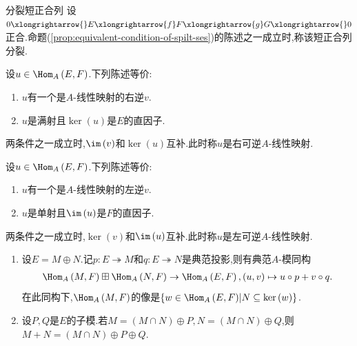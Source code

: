 \begin{definition}{分裂短正合列}{}
	设$0\xlongrightarrow{}E\xlongrightarrow{f}F\xlongrightarrow{g}G\xlongrightarrow{}0$正合.命题(\ref{prop:equivalent-condition-of-spilt-ses})的陈述之一成立时,称该短正合列分裂.
\end{definition}

\begin{corollary}{}{}
	设$u\in\Hom_{A}\left(E,F\right)$.下列陈述等价:
	\begin{enumerate}
		\item $u$有一个是$A$-线性映射的右逆$v$.
		\item $u$是满射且$\ker\left(u\right)$是$E$的直因子.
	\end{enumerate}
	两条件之一成立时,$\im\left(v\right)$和$\ker\left(u\right)$互补.此时称$u$是右可逆$A$-线性映射.
\end{corollary}

\begin{corollary}{}{}
	设$u\in\Hom_{A}\left(E,F\right)$.下列陈述等价:
	\begin{enumerate}
		\item $u$有一个是$A$-线性映射的左逆$v$.
		\item $u$是单射且$\im\left(u\right)$是$F$的直因子.
	\end{enumerate}
	两条件之一成立时,$\ker\left(v\right)$和$\im\left(u\right)$互补.此时称$u$是左可逆$A$-线性映射.
\end{corollary}

\begin{remark}{}{}
	\begin{enumerate}
		\item 设$E=M\oplus N$.记$p:E\twoheadrightarrow M$和$q:E\twoheadrightarrow N$是典范投影,则有典范$A$-模同构
		\begin{align*}
			\Hom_{A}\left(M,F\right)\boxplus\Hom_{A}\left(N,F\right)\to\Hom_{A}\left(E,F\right),\left(u,v\right)\mapsto u\circ p+v\circ q.
		\end{align*}
		在此同构下,$\Hom_{A}\left(M,F\right)$的像是$\left\{w\in\Hom_{A}\left(E,F\right)\middle|N\subseteq\ker\left(w\right)\right\}$.
		\item 设$P,Q$是$E$的子模.若$M=\left(M\cap N\right)\oplus P,N=\left(M\cap N\right)\oplus Q$,则$M+N=\left(M\cap N\right)\oplus P\oplus Q$.
	\end{enumerate}
\end{remark}

